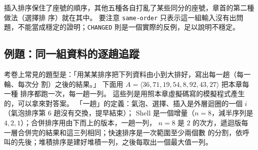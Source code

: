 插入排序保住了座號的順序，其他五種各自打亂了某些同分的座號，章首的第二種做法（選擇排
序）就在其中。 要注意
\texttt{same-order} 只表示這一組輸入沒有出問題，不能當成穩定的證明；\texttt{CHANGED}
則是一個實際的反例，足以說明不穩定。

\subsection{例題：同一組資料的逐趟追蹤}

考卷上常見的題型是：「用某某排序把下列資料由小到大排好，寫出每一趟（每一輪、每次分
割）之後的結果。」 下面用 $A = \langle 36, 71, 19, 54, 8, 92, 43, 27 \rangle$ 把本章每一種
排序都跑一次，每一趟一列。 這些列是用照本章虛擬碼寫的模擬程式產生的，可以拿來對答案。
「一趟」的定義：氣泡、選擇、插入是外層迴圈的一個 $i$（氣泡排序第 6 趟沒有交換，提早結束）；
Shell 是一個增量（$n = 8$，減半序列是 $4, 2, 1$）；合併排序用由下而上的版本，一趟一列，
$n = 8$ 是 $2$ 的次方，遞迴版每一層合併完的結果和這三列相同；快速排序是一次範圍至少兩個數
的分割，依呼叫的先後；堆積排序是建好堆積一列，之後每取出一個最大值一列。

